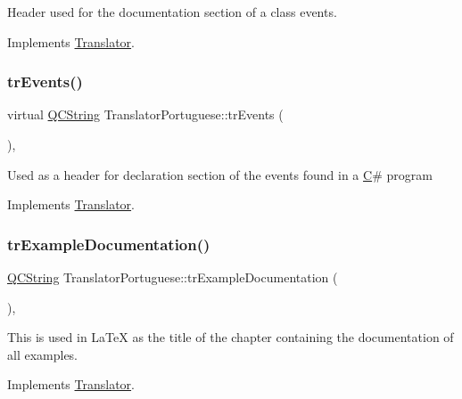 Header used for the documentation section of a class\textquotesingle{} events. 

Implements \mbox{\hyperlink{class_translator}{Translator}}.

\mbox{\label{class_translator_portuguese_a3d881a57ecc9b039ad91d4f811082e07}} 
\subsubsection{\texorpdfstring{trEvents()}{trEvents()}}
{\footnotesize\ttfamily virtual \mbox{\hyperlink{class_q_c_string}{Q\+C\+String}} Translator\+Portuguese\+::tr\+Events (\begin{DoxyParamCaption}{ }\end{DoxyParamCaption})\hspace{0.3cm}{\ttfamily [inline]}, {\ttfamily [virtual]}}

Used as a header for declaration section of the events found in a \mbox{\hyperlink{class_c}{C}}\# program 

Implements \mbox{\hyperlink{class_translator}{Translator}}.

\mbox{\label{class_translator_portuguese_afd4d5a5fa30767abf396574af3b22edf}} 
\subsubsection{\texorpdfstring{trExampleDocumentation()}{trExampleDocumentation()}}
{\footnotesize\ttfamily \mbox{\hyperlink{class_q_c_string}{Q\+C\+String}} Translator\+Portuguese\+::tr\+Example\+Documentation (\begin{DoxyParamCaption}{ }\end{DoxyParamCaption})\hspace{0.3cm}{\ttfamily [inline]}, {\ttfamily [virtual]}}

This is used in La\+TeX as the title of the chapter containing the documentation of all examples. 

Implements \mbox{\hyperlink{class_translator}{Translator}}.


